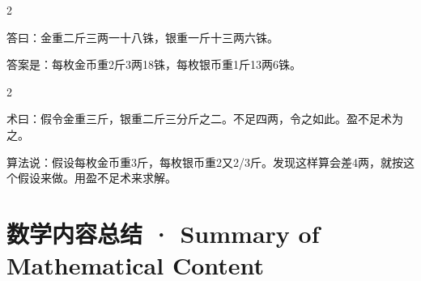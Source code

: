 \documentclass[11pt,a4paper]{article}
\begin{document}
\vspace{0.2cm}

\begin{paracol}{2}

\begin{answerbox}[\CJKfamily{rm}答 · 原文]
答曰：金重二斤三两一十八铢，银重一斤十三两六铢。
\end{answerbox}

\switchcolumn

\begin{answerbox}[白话文：答案]
答案是：每枚金币重2斤3两18铢，每枚银币重1斤13两6铢。
\end{answerbox}

\end{paracol}

\vspace{0.2cm}

\begin{paracol}{2}

\begin{methodbox}[\CJKfamily{rm}术 · 原文]
术曰：假令金重三斤，银重二斤三分斤之二。不足四两，令之如此。盈不足术为之。
\end{methodbox}

\switchcolumn

\begin{methodbox}
算法说：假设每枚金币重3斤，每枚银币重2又2/3斤。发现这样算会差4两，就按这个假设来做。用盈不足术来求解。
\end{methodbox}

\end{paracol}

\newpage

\section{数学内容总结 · Summary of Mathematical Content}
\end{document}
